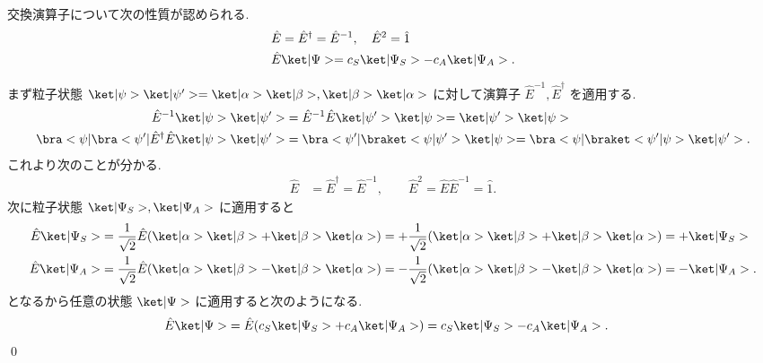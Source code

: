 \documentclass[uplatex,dvipdfmx,a4paper,11pt]{jlreq}
\makeatletter
\numberwithin{equation}{section}
\theoremstyle{definition}
\renewenvironment{proof}[1][\proofname]{\par
  \normalfont
  \topsep6\p@\@plus6\p@ \trivlist
  \item[\hskip\labelsep{\bfseries #1}\@addpunct{\bfseries}]\ignorespaces\quad\par
}{%
  \qed\endtrivlist\@endpefalse
}
\renewcommand\proofname{証明}
\makeatother
\begin{document}
\begin{proposition}[Q21-1(iii)(iv)(v)]
  交換演算子について次の性質が認められる.
  \begin{align}
     & \hat{E} = \hat{E}^\dagger = \hat{E}^{-1}, \quad \hat{E}^2 = \hat{1} \\
     & \hat{E}\ket|\Psi> = c_S\ket|\Psi_S> - c_A\ket|\Psi_A>.
  \end{align}
\end{proposition}
\begin{proof}
  まず粒子状態 $\ket|\psi>\ket|\psi'> = \ket|\alpha>\ket|\beta>, \ket|\beta>\ket|\alpha>$ に対して演算子 $\hat{E}^{-1}, \hat{E}^\dagger$ を適用する.
  \begin{align}
    \hat{E}^{-1}\ket|\psi>\ket|\psi'>                                & = \hat{E}^{-1}\hat{E}\ket|\psi'>\ket|\psi> = \ket|\psi'>\ket|\psi>                     \\
    \bra<\psi|\bra<\psi'|\hat{E}^\dagger\hat{E}\ket|\psi>\ket|\psi'> & = \bra<\psi'|\braket<\psi|\psi'>\ket|\psi> = \bra<\psi|\braket<\psi'|\psi>\ket|\psi'>.
  \end{align}
  これより次のことが分かる.
  \begin{align}
    \hat{E} & = \hat{E}^\dagger = \hat{E}^{-1}, \qquad \hat{E}^2 = \hat{E}\hat{E}^{-1} = \hat{1}.
  \end{align}
  次に粒子状態 $\ket|\Psi_S>, \ket|\Psi_A>$ に適用すると
  \begin{align}
    \hat{E}\ket|\Psi_S> & = \frac{1}{\sqrt{2}}\hat{E}(\ket|\alpha>\ket|\beta> + \ket|\beta>\ket|\alpha>) = +\frac{1}{\sqrt{2}}(\ket|\alpha>\ket|\beta> + \ket|\beta>\ket|\alpha>) = +\ket|\Psi_S>  \\
    \hat{E}\ket|\Psi_A> & = \frac{1}{\sqrt{2}}\hat{E}(\ket|\alpha>\ket|\beta> - \ket|\beta>\ket|\alpha>) = -\frac{1}{\sqrt{2}}(\ket|\alpha>\ket|\beta> - \ket|\beta>\ket|\alpha>) = -\ket|\Psi_A>.
  \end{align}
  となるから任意の状態 $\ket|\Psi>$ に適用すると次のようになる.
  \begin{align}
    \hat{E}\ket|\Psi> & = \hat{E}(c_S\ket|\Psi_S> + c_A\ket|\Psi_A>) = c_S\ket|\Psi_S> - c_A\ket|\Psi_A>.
  \end{align}
\end{proof}
\end{document}
